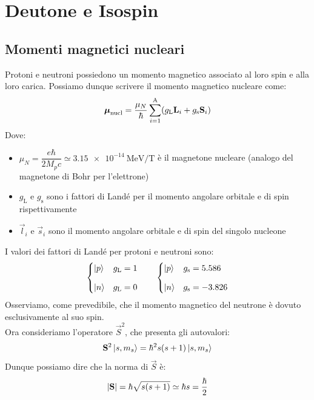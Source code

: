 \chapter[Particelle elementari]{Deutone e Isospin}
\section{Momenti magnetici nucleari}
Protoni e neutroni possiedono un momento magnetico associato al loro spin e alla loro carica. Possiamo dunque scrivere il momento magnetico nucleare come:
\begin{equation}
 \boldsymbol{\mu}_{\text{nucl}} = \dfrac{\mu_N}{\hbar} \displaystyle\sum_{i=1}^{\text{A}} (g_{\text{L}} \vb{L}_i + g_{\text{s}} \vb{S}_i)
\end{equation}
Dove:
\begin{itemize}
 \item $\mu_N = \dfrac{e \hbar}{2 M_p c} \simeq \qty{3.15e-14}{\mega\electronvolt\per\tesla}$ è il magnetone nucleare (analogo del magnetone di Bohr per l'elettrone)
 \item $g_{\text{L}}$ e $g_{\text{s}}$ sono i fattori di Landé per il momento angolare orbitale e di spin rispettivamente
 \item $\vec{l}_i$ e $\vec{s}_i$ sono il momento angolare orbitale e di spin del singolo nucleone
\end{itemize}
I valori dei fattori di Landé per protoni e neutroni sono:
\begin{equation}
  \begin{cases}
    \ket{p} & g_{\text{L}} = 1\\[8pt]
    \ket{n} & g_{\text{L}} = 0
  \end{cases} \qquad
  \begin{cases}
    \ket{p} & g_{\text{s}} = 5.586 \\[8pt]
    \ket{n} & g_{\text{s}} = -3.826
  \end{cases}
\end{equation}
Osserviamo, come prevedibile, che il momento magnetico del neutrone è dovuto esclusivamente al suo spin.\\
Ora consideriamo l'operatore $\vec{S}^2$, che presenta gli autovalori:
\begin{equation}
    \vb{S}^2 \ket{s,m_s} = \hbar^2 s(s+1) \ket{s,m_s}
\end{equation}
Dunque possiamo dire che la norma di $\vec{S}$ è:
\begin{equation}
    \abs{\vb{S}} = \hbar \sqrt{s(s+1)} \simeq \hbar s = \dfrac{\hbar}{2}
\end{equation}
